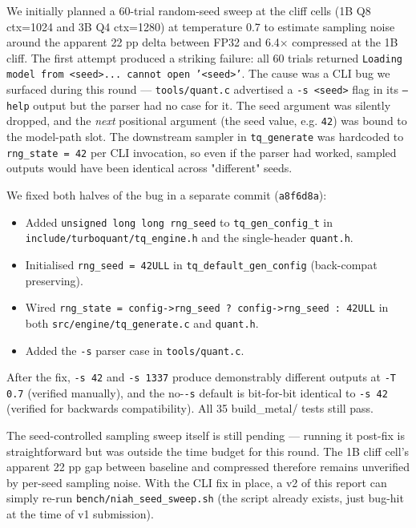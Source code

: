 \documentclass[11pt]{article}
\begin{document}
We initially planned a 60-trial random-seed sweep at the cliff cells (1B Q8 ctx=1024 and 3B Q4 ctx=1280) at temperature 0.7 to estimate sampling noise around the apparent 22 pp delta between FP32 and 6.4× compressed at the 1B cliff. The first attempt produced a striking failure: all 60 trials returned \texttt{Loading model from <seed>... cannot open '<seed>'}. The cause was a CLI bug we surfaced during this round — \texttt{tools/quant.c} advertised a \texttt{-s <seed>} flag in its \texttt{--help} output but the parser had no case for it. The seed argument was silently dropped, and the \textit{next} positional argument (the seed value, e.g. \texttt{42}) was bound to the model-path slot. The downstream sampler in \texttt{tq\_generate} was hardcoded to \texttt{rng\_state = 42} per CLI invocation, so even if the parser had worked, sampled outputs would have been identical across "different" seeds.


We fixed both halves of the bug in a separate commit (\texttt{a8f6d8a}):

\begin{itemize}
\item Added \texttt{unsigned long long rng\_seed} to \texttt{tq\_gen\_config\_t} in \texttt{include/turboquant/tq\_engine.h} and the single-header \texttt{quant.h}.
\item Initialised \texttt{rng\_seed = 42ULL} in \texttt{tq\_default\_gen\_config} (back-compat preserving).
\item Wired \texttt{rng\_state = config->rng\_seed ? config->rng\_seed : 42ULL} in both \texttt{src/engine/tq\_generate.c} and \texttt{quant.h}.
\item Added the \texttt{-s} parser case in \texttt{tools/quant.c}.
\end{itemize}


After the fix, \texttt{-s 42} and \texttt{-s 1337} produce demonstrably different outputs at \texttt{-T 0.7} (verified manually), and the no-\texttt{-s} default is bit-for-bit identical to \texttt{-s 42} (verified for backwards compatibility). All 35 build\_metal/ tests still pass.


The seed-controlled sampling sweep itself is still pending — running it post-fix is straightforward but was outside the time budget for this round. The 1B cliff cell's apparent 22 pp gap between baseline and compressed therefore remains unverified by per-seed sampling noise. With the CLI fix in place, a v2 of this report can simply re-run \texttt{bench/niah\_seed\_sweep.sh} (the script already exists, just bug-hit at the time of v1 submission).
\end{document}
